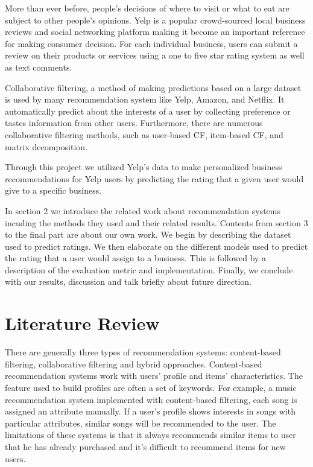 \documentclass{llncs}
\begin{document}
More than ever before, people’s decisions of where to visit or what to eat are subject to other people’s opinions. Yelp is a popular crowd-sourced local business reviews and social networking platform making it become an important reference for making consumer decision. For each individual business, users can submit a review on their products or services using a one to five star rating system as well as text comments.

Collaborative filtering, a method of making predictions based on a large dataset is used by many recommendation system like Yelp, Amazon, and Netflix. It automatically predict about the interests of a user by collecting preference or tastes information from other users. Furthermore, there are numerous collaborative filtering methods, such as user-based CF, item-based CF, and matrix decomposition. 

Through this project we utilized Yelp’s data to make personalized business recommendations for Yelp users by predicting the rating that a given user would give to a specific business.

In section 2 we introduce the related work about recommendation systems incuding the methods they used and their related results. Contents from section 3 to the final part are about our own work. We begin by describing the dataset used to predict ratings. We then elaborate on the different models used to predict the rating that a user would assign to a business. This is followed by a description of the evaluation metric and implementation. Finally, we conclude with our results, discussion and talk briefly about future direction.

\section{Literature Review}
There are generally three types of recommendation systems: content-based filtering, collaborative filtering and hybrid approaches. Content-based recommendation systems work with users’ profile and items’ characteristics. The feature used to build profiles are often a set of keywords. For example, a music recommendation system\cite{MJ} implemented with content-based filtering, each song is assigned an attribute manually. If a user’s profile shows interests in songs with particular attributes, similar songs will be recommended to the user. The limitations of these systems is that it always recommends similar items to user that he has already purchased and it’s difficult to recommend items for new users. 
\end{document}
